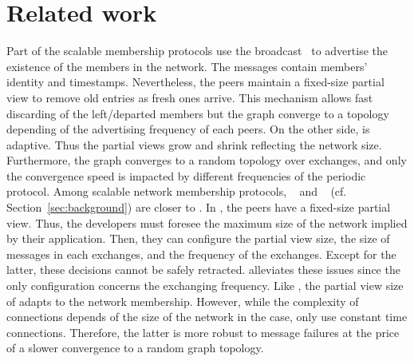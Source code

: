 
\section{Related work}
\label{sec:relatedwork}

Part of the scalable membership protocols use the
broadcast~\cite{eugster2003lightweight, tolgyeski2009adaptive} to advertise the
existence of the members in the network. The messages contain members' identity
and timestamps. Nevertheless, the peers maintain a fixed-size partial view to
remove old entries as fresh ones arrive. This mechanism allows fast discarding
of the left/departed members but the graph converge to a topology depending of
the advertising frequency of each peers. On the other side, \SCAMPLON{} is
adaptive. Thus the partial views grow and shrink reflecting the network
size. Furthermore, the graph converges to a random topology over exchanges, and
only the convergence speed is impacted by different frequencies of the periodic
protocol. Among scalable network membership protocols,
\CYCLON{}~\cite{voulgaris2005cyclon} and \SCAMP{}~\cite{ganesh2003peer}
(cf. Section~\ref{sec:background}) are closer to \SCAMPLON{}. In \CYCLON{}, the
peers have a fixed-size partial view. Thus, the developers must foresee the
maximum size of the network implied by their application. Then, they can
configure the partial view size, the size of messages in each exchanges, and
the frequency of the exchanges. Except for the latter, these decisions cannot
be safely retracted.  \SCAMPLON{} alleviates these issues since the only
configuration concerns the exchanging frequency. Like \SCAMP{}, the partial
view size of \SCAMPLON{} adapts to the network membership. However, while the
complexity of connections depends of the size of the network in the \SCAMP{}
case, \SCAMPLON{} only use constant time connections. Therefore, the latter is
more robust to message failures at the price of a slower convergence to a
random graph topology.

